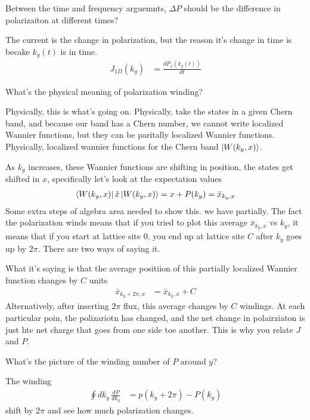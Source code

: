 \begin{question}
    Between the time and frequency arguemnts,
    $\Delta P$ should be the difference in polarizaiton at different times?
\end{question}
The current is the change in polarization,
but the reason it's change in time is becake $k_y(t)$ is in time.
\begin{align}
    J_{1D}(k_y) &=
    \frac{dP_x\left( k_y(t) \right)}{dt}
\end{align}

\begin{question}
    What's the physical meaning of polarization winding?
\end{question}
Physically,
this is what's going on.
Physically,
take the states in a given Chern band,
and because our band has a Chern number,
we cannot write localized Wannier functions,
but they can be paritally localized Wannier functions.
Physically, localized wannier functions for the Chern band
$\ket{W(k_y, x)}$.

As $k_y$ increases,
these Wannier functions are shifting in position,
the states get shifted in $x$,
specifically let's look at the expectation values
\begin{align}
    \bra{W(k_y,x)} \hat{x} \ket{W(k_y, x)}
    = x + P(k_y)
    = \bar{x}_{k_y, x}
\end{align}
Some extra steps of algebra area needed to show this.
we have partially.
The fact the polarization winds
means that if you tried to plot this average
$\bar{x}_{k_y, x}$ vs $k_y$,
it means that if you start at lattice site 0,
you end up at lattice site $C$ after $k_y$ goes up by $2\pi$.
There are two ways of saying it.

What it's saying is that the average positiion of this partially localized
Wannier function changes by $C$ units
\begin{align}
    \bar{x}_{k_y + 2\pi, x} &=
    \bar{x}_{k_y, x} + C
\end{align}
Alternatively,
after inserting $2\pi$ flux,
this average changes by $C$ windings.
At each particular poin,
the polizariotn has changed,
and the net change in polairziaton is just hte net charge that goes from one
side toe another.
This is why you relate $J$ and $P$.

\begin{question}
    What's the picture of the winding number of $P$ around $y$?
\end{question}
The winding
\begin{align}
    \oint dk_y\, \frac{dP}{dk_y}
    &=
    p(k_y + 2\pi) - P(k_y)
\end{align} shift by $2\pi$ and see how much polarization changes.


